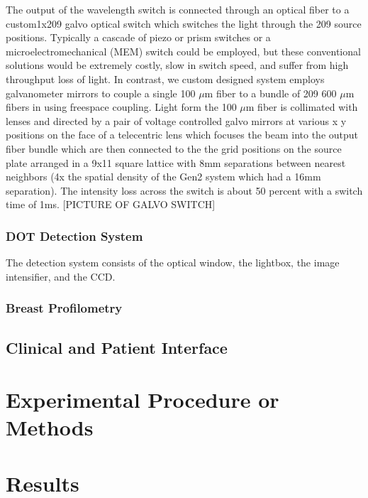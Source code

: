 The output of the wavelength switch is connected through an optical fiber to a custom1x209 galvo optical switch  which switches the light through the 209 source positions. Typically a cascade of piezo or prism switches or a microelectromechanical (MEM) switch could be employed, but these conventional solutions would be extremely costly, slow in switch speed, and suffer from high throughput loss of light. In contrast, we custom designed system employs galvanometer mirrors to couple a single 100 $\mu$m fiber to a bundle of 209 600 $\mu$m fibers in using freespace coupling. Light form the 100 $\mu$m fiber is collimated with lenses and directed by a pair of voltage controlled galvo mirrors at various x y positions on the face of a telecentric lens which focuses the beam into the output fiber bundle which are then connected to the the grid positions on the source plate arranged in a 9x11 square lattice with 8mm separations between nearest neighbors (4x the spatial density of the Gen2 system which had a 16mm separation). The intensity loss across the switch is about 50 percent with a switch time of 1ms.
[PICTURE OF GALVO SWITCH]

\subsubsection{DOT Detection System}
The detection system consists of the optical window, the lightbox, the image intensifier, and the CCD.

\subsubsection{Breast Profilometry}

\subsection{Clinical and Patient Interface}

\section{Experimental Procedure or Methods}

\section{Results}